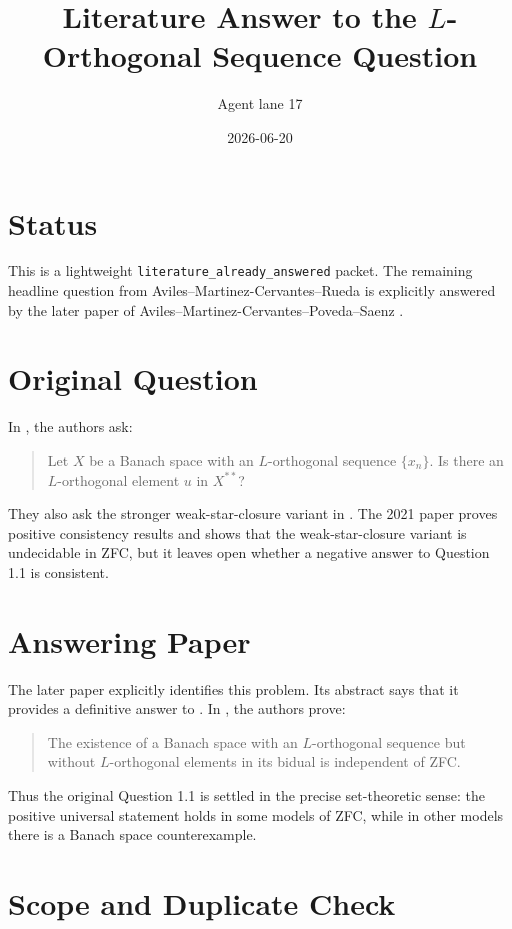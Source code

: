 \documentclass[11pt]{article}
\title{Literature Answer to the \(L\)-Orthogonal Sequence Question}
\author{Agent lane 17}
\date{2026-06-20}
\begin{document}
\maketitle

\section*{Status}

This is a lightweight \texttt{literature\_already\_answered} packet. The
remaining headline question from Aviles--Martinez-Cervantes--Rueda
\cite{AMR2021} is explicitly answered by the later paper of
Aviles--Martinez-Cervantes--Poveda--Saenz \cite{AMPS2025}.

\section*{Original Question}

In \cite[Question 1.1]{AMR2021}, the authors ask:
\begin{quote}
Let \(X\) be a Banach space with an \(L\)-orthogonal sequence
\(\{x_n\}\). Is there an \(L\)-orthogonal element \(u\) in \(X^{**}\)?
\end{quote}
They also ask the stronger weak-star-closure variant in
\cite[Question 1.2]{AMR2021}. The 2021 paper proves positive consistency
results and shows that the weak-star-closure variant is undecidable in ZFC,
but it leaves open whether a negative answer to Question 1.1 is consistent.

\section*{Answering Paper}

The later paper \cite{AMPS2025} explicitly identifies this problem. Its
abstract says that it provides a definitive answer to
\cite[Question 1.1]{AMR2021}. In \cite[Main Theorem, ``Independence of
\(L\)-elements'']{AMPS2025}, the authors prove:
\begin{quote}
The existence of a Banach space with an \(L\)-orthogonal sequence but without
\(L\)-orthogonal elements in its bidual is independent of ZFC.
\end{quote}
Thus the original Question 1.1 is settled in the precise set-theoretic sense:
the positive universal statement holds in some models of ZFC, while in other
models there is a Banach space counterexample.

\section*{Scope and Duplicate Check}
\end{document}

